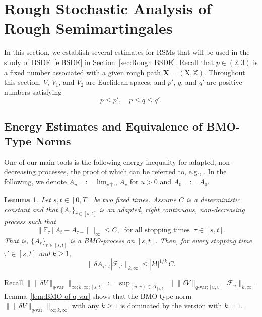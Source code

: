\documentclass[11pt,reqno]{amsart}
\newtheorem{lemma}{Lemma}[section]
\numberwithin{equation}{section}
\def\E{\mathbb E}
\begin{document}
\section{Rough Stochastic Analysis of Rough Semimartingales}\label{sec:advanced analysis of rough path}


In this section, we establish several estimates for RSMs that will be used in the study of BSDE~\eqref{e:BSDE} in Section~\ref{sec:Rough BSDE}. Recall that $p\in(2,3)$ is a fixed number associated with a given rough path $\mathbf X=(\mathrm X, \mathbb X)$. Throughout this section, $V$, $V_1$, and $V_2$ are Euclidean spaces; and $p'$, $q$, and $q'$ are positive numbers satisfying 
\begin{equation}
\label{cond31}
p\le p', \quad p\le q \le q'.
\end{equation}


\subsection{Energy Estimates and Equivalence of BMO-Type Norms}\label{subsec:energy estimates and RSM estimates}

One of our main tools is the following energy inequality for adapted, non-decreasing processes, the proof of which can be referred to, e.g., \cite[Lemma~A.2]{le2022quantitative}. In the following, we denote $A_{u-} := \lim_{v \uparrow u} A_v$ for $u > 0$ and $A_{0-} := A_0$. 

\begin{lemma}\label{lem:Energy inequality}
Let $s,t \in [0,T]$ be two fixed times. Assume $C$ is a deterministic constant and that $\{A_r\}_{r \in [s,t]}$ is an adapted, right continuous, non-decreasing process such that 
\begin{equation*}
\|\E_{\tau} [A_{t} - A_{\tau-}]\|_{\infty} \le C,\ \text{ for all stopping times }\ \tau \in [s,t].
\end{equation*} 
That is, $\{A_r\}_{r \in [s,t]}$ is a \emph{BMO}-process on $[s,t]$. Then, for every stopping time $\tau' \in [s,t]$ and $k \ge 1$,
\begin{equation*}
\| \delta A_{\tau',t} | \mathcal F_{\tau'}\|_{k,\infty} \le |k!|^{1/k} \, C.
\end{equation*}
\end{lemma}

Recall $\| \|\delta V\|_{q\text{-}\mathrm{var}} \|_{\infty;k,\infty;[s,t]} := \sup_{(u,v) \in \Delta_{[s,t]}} \| \|\delta V\|_{q\text{-}\mathrm{var};[u,v]} |\mathcal F_u\|_{k,\infty}$. 
Lemma~\ref{lem:BMO of q-var} shows that the \textrm{BMO}-type norm $\| \|\delta V\|_{q\text{-}\mathrm{var}} \|_{\infty;k,\infty}$ with any $k \ge 1$ is dominated by the version with $k=1$. 
\end{document}
